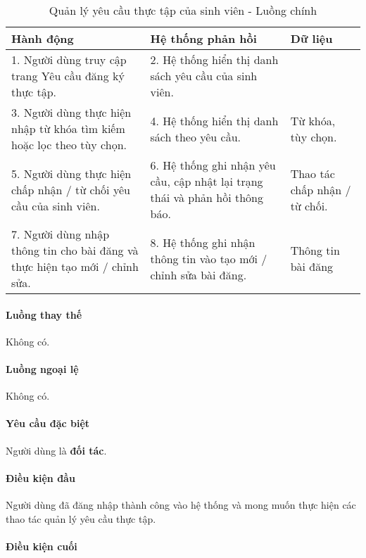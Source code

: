 \documentclass[./../main.tex]{subfiles}
\begin{document}
\begin{table}[H]
  \caption{Quản lý yêu cầu thực tập của sinh viên - Luồng chính}
  \label{tab:partner_manage_requests}
  \begin{tabularx}{\textwidth}{|X|X|X|}
    \hline
\textbf{Hành động} & \textbf{Hệ thống phản hồi} & \textbf{Dữ liệu} \\ \hline
1. Người dùng truy cập trang Yêu cầu đăng ký thực tập. & 2. Hệ thống hiển thị danh sách yêu cầu của sinh viên. &  \\ \hline
3. Người dùng thực hiện nhập từ khóa tìm kiếm hoặc lọc theo tùy chọn. & 4. Hệ thống hiển thị danh sách theo yêu cầu. & Từ khóa, tùy chọn. \\ \hline
5. Người dùng thực hiện chấp nhận / từ chối yêu cầu của sinh viên. & 6. Hệ thống ghi nhận yêu cầu, cập nhật lại trạng thái và phản hồi thông báo. & Thao tác chấp nhận / từ chối. \\ \hline
7. Người dùng nhập thông tin cho bài đăng và thực hiện tạo mới / chỉnh sửa. & 8. Hệ thống ghi nhận thông tin vào tạo mới / chỉnh sửa bài đăng. & Thông tin bài đăng \\ \hline
  \end{tabularx}
\end{table}

\paragraph*{Luồng thay thế} Không có.

\paragraph*{Luồng ngoại lệ} Không có.

\paragraph*{Yêu cầu đặc biệt}

Người dùng là \textbf{đối tác}.

\paragraph*{Điều kiện đầu}

Người dùng đã đăng nhập thành công vào hệ thống và mong muốn thực hiện các thao tác quản lý yêu cầu thực tập.

\paragraph*{Điều kiện cuối}
\end{document}
